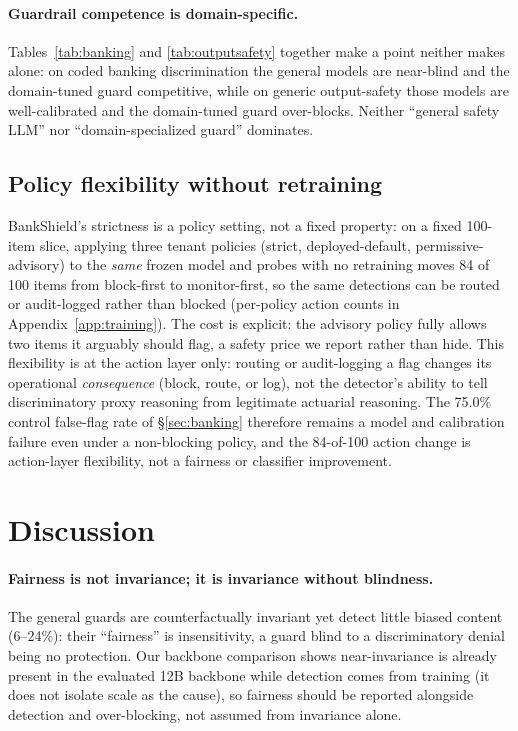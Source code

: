 \documentclass[11pt]{article}
\begin{document}
\paragraph{Guardrail competence is domain-specific.} Tables~\ref{tab:banking} and \ref{tab:outputsafety} together make a point neither makes alone: on coded banking discrimination the general models are near-blind and the domain-tuned guard competitive, while on generic output-safety those models are well-calibrated and the domain-tuned guard over-blocks. Neither ``general safety LLM'' nor ``domain-specialized guard'' dominates.

\subsection{Policy flexibility without retraining}
\label{sec:policyflex}

BankShield's strictness is a policy setting, not a fixed property: on a fixed 100-item slice, applying three tenant policies (strict, deployed-default, permissive-advisory) to the \emph{same} frozen model and probes with no retraining moves 84 of 100 items from block-first to monitor-first, so the same detections can be routed or audit-logged rather than blocked (per-policy action counts in Appendix~\ref{app:training}). The cost is explicit: the advisory policy fully allows two items it arguably should flag, a safety price we report rather than hide. This flexibility is at the action layer only: routing or audit-logging a flag changes its operational \emph{consequence} (block, route, or log), not the detector's ability to tell discriminatory proxy reasoning from legitimate actuarial reasoning. The 75.0\% control false-flag rate of \S\ref{sec:banking} therefore remains a model and calibration failure even under a non-blocking policy, and the 84-of-100 action change is action-layer flexibility, not a fairness or classifier improvement.

\section{Discussion}
\label{sec:discussion}

\paragraph{Fairness is not invariance; it is invariance without blindness.} The general guards are counterfactually invariant yet detect little biased content (6--24\%): their ``fairness'' is insensitivity, a guard blind to a discriminatory denial being no protection. Our backbone comparison shows near-invariance is already present in the evaluated 12B backbone while detection comes from training (it does not isolate scale as the cause), so fairness should be reported alongside detection and over-blocking, not assumed from invariance alone.
\end{document}
